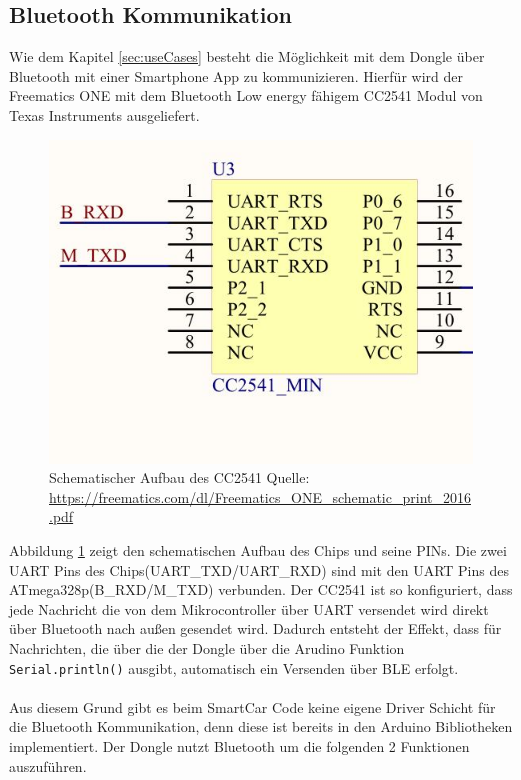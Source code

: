 \subsection{Bluetooth Kommunikation}
\label{sec:Bluetooth}
Wie dem Kapitel \ref{sec:useCases} besteht die Möglichkeit mit dem Dongle über Bluetooth mit einer Smartphone App zu kommunizieren. Hierfür wird der Freematics ONE mit dem Bluetooth Low energy fähigem CC2541 Modul von Texas Instruments ausgeliefert.
\begin{figure}[h]
  \begin{center}
    \includegraphics[scale=0.5]{./img/BLEChip.jpg}
    \caption{Schematischer Aufbau des CC2541 Quelle: \url{https://freematics.com/dl/Freematics_ONE_schematic_print_2016.pdf}}
    \label{fig:BLEChip}
  \end{center}
\end{figure} 
Abbildung \ref{fig:BLEChip} zeigt den schematischen Aufbau des Chips und seine PINs. Die zwei UART Pins des Chips(UART\_TXD/UART\_RXD) sind mit den UART Pins des ATmega328p(B\_RXD/M\_TXD) verbunden. Der CC2541 ist so konfiguriert, dass jede Nachricht die von dem Mikrocontroller über UART versendet wird direkt über Bluetooth nach außen gesendet wird. Dadurch entsteht der Effekt, dass für Nachrichten, die über die der Dongle über die Arudino Funktion \texttt{Serial.println()} ausgibt, automatisch ein Versenden über BLE erfolgt.
\paragraph{}{}
Aus diesem Grund gibt es beim SmartCar Code keine eigene Driver Schicht für die Bluetooth Kommunikation, denn diese ist bereits in den Arduino Bibliotheken implementiert. Der Dongle nutzt Bluetooth um die folgenden 2 Funktionen auszuführen.
